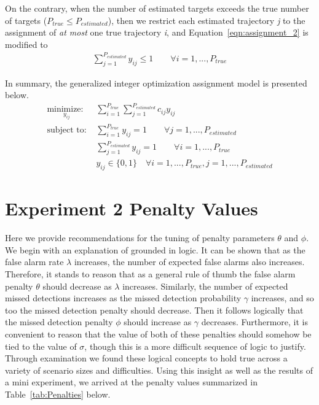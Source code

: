 \documentclass[journal]{IEEEtran}
\begin{document}
On the contrary, when the number of estimated targets exceeds the true number of targets ($P_{true}\leq P_{estimated}$), then we restrict each estimated trajectory \textit{j} to the assignment of \textit{at most} one true trajectory \textit{i}, and Equation~\ref{eqn:assignment_2} is modified to
\begin{align}
\sum_{j=1}^{P_{estimated}} y_{ij} \leq 1 \qquad \forall i = 1,...,P_{true}
\end{align}

In summary, the generalized integer optimization assignment model is presented below.  
\begin{align*}
\underset{y_{ij}}{\text{minimize: }} & \sum_{i=1}^{P_{true}} \sum_{j=1}^{P_{estimated}} c_{ij}y_{ij}\\
\text{subject to: }	& \sum_{i=1}^{P_{true}} y_{ij} = 1 \qquad \forall j = 1,...,P_{estimated}\\
				& \sum_{j=1}^{P_{estimated}} y_{ij} = 1 \qquad \forall i = 1,...,P_{true}\\
				& y_{ij} \in \{0,1\} \quad \forall i = 1,...,P_{true},j = 1,...,P_{estimated}
\end{align*}

\section{Experiment 2 Penalty Values}\label{sec:Penalty_Appendix}
Here we provide recommendations for the tuning of penalty parameters $\theta$ and $\phi$. We begin with an explanation of grounded in logic. It can be shown that as the false alarm rate $\lambda$ increases, the number of expected false alarms also increases. Therefore, it stands to reason that as a general rule of thumb the false alarm penalty $\theta$ should decrease as $\lambda$ increases. Similarly, the number of expected missed detections increases as the missed detection probability $\gamma$ increases, and so too the missed detection penalty should decrease. Then it follows logically that the missed detection penalty $\phi$ should increase as $\gamma$ decreases. Furthermore, it is convenient to reason that the value of both of these penalties should somehow be tied to the value of $\sigma$, though this is a more difficult sequence of logic to justify. Through examination we found these logical concepts to hold true across a variety of scenario sizes and difficulties. Using this insight as well as the results of a mini experiment, we arrived at the penalty values summarized in Table~\ref{tab:Penalties} below. 
\end{document}
